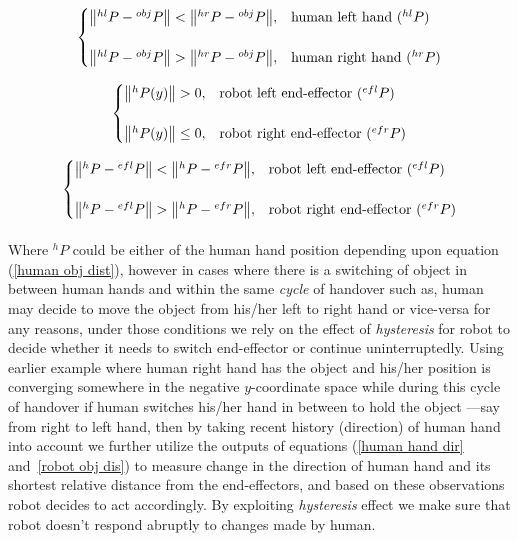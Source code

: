 \documentclass[a4paper, 12pt, oneside]{Thesis}  %
\begin{document}
\begin{equation}\label{human obj dist}
\centering
\begin{cases}
	\norm{{}^{hl}{P} - {}^{obj}{P}} < \norm{{}^{hr}{P} - {}^{obj}{P}}, & \text{human left hand (${}^{hl}{P}$)}  \\
	\\
	\norm{{}^{hl}{P} - {}^{obj}{P}} > \norm{{}^{hr}{P} - {}^{obj}{P}}, & \text{human right hand (${}^{hr}{P}$)}
\end{cases}         
\end{equation}


\begin{equation}\label{human hand dir}
\centering
\begin{cases}
\norm{{}^{h}{P}(y)} > 0,  &  \text{robot left end-effector (${}^{efl}{P}$)} \\
\\
\norm{{}^{h}{P}(y)} \leq 0,  &  \text{robot right end-effector (${}^{efr}{P}$)}
\end{cases}         
\end{equation}

\begin{equation}\label{robot obj dis}
\centering
\begin{cases}
\norm{{}^{h}{P} - {}^{efl}{P}} < \norm{{}^{h}{P} - {}^{efr}{P}}, &  \text{robot left end-effector (${}^{efl}{P}$)} \\
\\
\norm{{}^{h}{P} - {}^{efl}{P}} > \norm{{}^{h}{P} - {}^{efr}{P}}, &  \text{robot right end-effector (${}^{efr}{P}$)}
\end{cases}
\end{equation}

\paragraph*{}
Where ${}^{h}{P}$ could be either of the human hand position depending upon equation (\ref{human obj dist}), however in cases where there is a switching of object in between human hands and within the same \textit{cycle} of handover such as, human may decide to move the object from his/her left to right hand or vice-versa for any reasons, under those conditions we rely on the effect of \textit{hysteresis} for robot to decide whether it needs to switch end-effector or continue uninterruptedly. Using earlier example where human right hand has the object and his/her position is converging somewhere in the negative $y$-coordinate space while during this cycle of handover if human switches his/her hand in between to hold the object ---say from right to left hand, then by taking recent history (direction) of human hand into account we further utilize the outputs of equations (\ref{human hand dir} and~\ref{robot obj dis}) to measure change in the direction of human hand and its shortest relative distance from the end-effectors, and based on these observations robot decides to act accordingly. By exploiting \textit{hysteresis} effect we make sure that robot doesn't respond abruptly to changes made by human.
\end{document}
